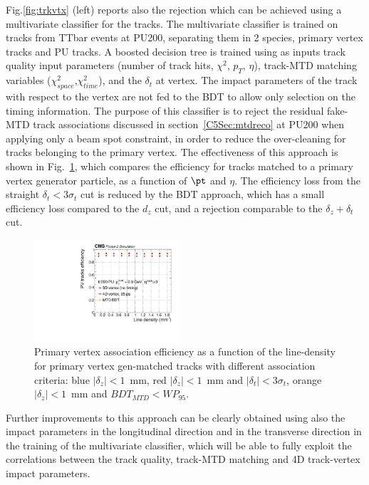 Fig.\ref{fig:trkvtx} (left) reports also the rejection which can be achieved using a multivariate classifier for the tracks. The multivariate classifier is trained on tracks from TTbar events at PU200, separating them in 2 species, primary vertex tracks and PU tracks. A boosted decision tree is trained using as inputs track quality input parameters (number of track hits, $\chi^2$, $p_{T}$, $\eta$), track-MTD matching variables ($\chi^2_{space}$,$\chi^2_{time}$), and the $\delta_{t}$ at vertex. The impact parameters of the track with respect to the vertex are not fed to the BDT to allow only selection on the timing information. The purpose of this classifier is to reject the residual fake-MTD track associations discussed in section~\ref{C5Sec:mtdreco} at PU200 when applying only a beam spot constraint, in order to reduce the over-cleaning for tracks belonging to the primary vertex. The effectiveness of this approach is shown in Fig.~\ref{fig:purej_eff}, which compares the efficiency for tracks matched to a primary vertex generator particle, as a function of $\pt$ and $\eta$. The efficiency loss from the straight $\delta_{t}<3\sigma_{t}$ cut is reduced by the BDT approach, which has a small efficiency loss compared to the $d_{z}$ cut, and a rejection comparable to the $\delta_{z}+\delta_{t}$ cut. 

\begin{figure}[!phtb]
\centering
\includegraphics[width=0.48\textwidth]{fig/performance/purej/BDT_noTrackInfo/track_eff_vs_linden_ttbar.pdf}
 \caption{Primary vertex association efficiency as a function of the line-density for primary vertex gen-matched tracks with different association criteria: blue $|\delta_{z}|<1$~mm,  red $|\delta_{z}|<1$~mm and $|\delta_{t}|<3\sigma_{t}$, orange $|\delta_{z}|<1$~mm and $BDT_{MTD}<WP_{95}$.  }
   \label{fig:purej_eff}
\end{figure}

Further improvements to this approach can be clearly obtained using also the impact parameters in the longitudinal direction and in the transverse direction in the training of the multivariate classifier, which will be able to fully exploit the correlations between the track quality, track-MTD matching and 4D track-vertex impact parameters. 

